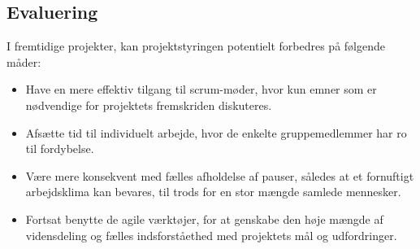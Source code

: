 \subsection{Evaluering}
I fremtidige projekter, kan projektstyringen potentielt forbedres på følgende måder: \\
\begin{itemize}[noitemsep]
	\item Have en mere effektiv tilgang til scrum-møder, hvor kun emner som er nødvendige for projektets fremskriden diskuteres.
	\item Afsætte tid til individuelt arbejde, hvor de enkelte gruppemedlemmer har ro til fordybelse.
	\item Være mere konsekvent med fælles afholdelse af pauser, således at et fornuftigt arbejdsklima kan bevares, til trods for en stor mængde samlede mennesker.
	\item Fortsat benytte de agile værktøjer, for at genskabe den høje mængde af vidensdeling og fælles indsforståethed med projektets mål og udfordringer.
\end{itemize}